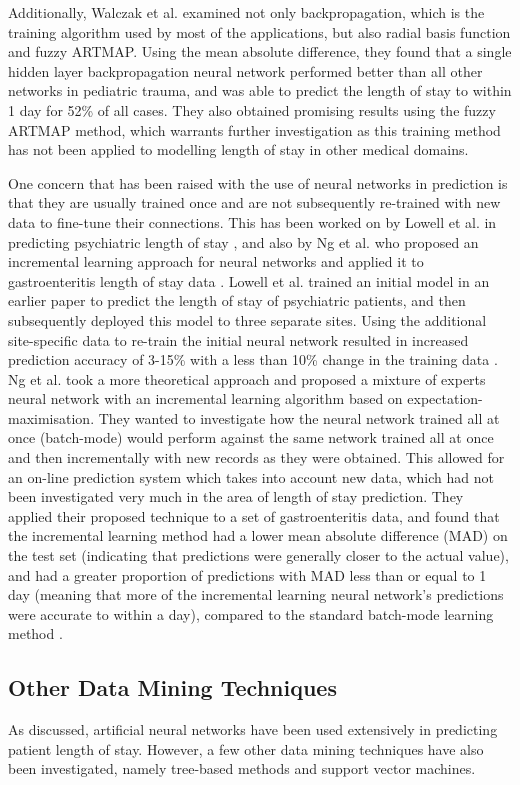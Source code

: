 Additionally, Walczak et al. examined not only backpropagation, which
is the training algorithm used by most of the applications, but also radial
basis function and fuzzy ARTMAP. Using the mean absolute difference, they
found that a single hidden layer backpropagation neural network performed
better than all other networks in pediatric trauma, and was able to predict
the length of stay to within 1 day for 52\% of all cases. They also obtained
promising results using the fuzzy ARTMAP method, which warrants further
investigation as this training method has not been applied to modelling
length of stay in other medical domains.

One concern that has been raised with the use of neural networks in prediction
is that they are usually trained once and are not subsequently re-trained with
new data to fine-tune their connections. This has been worked on by Lowell et
al. in predicting psychiatric length of stay \citep{Lowell1997}, and also by
Ng et al. who proposed an incremental learning approach for neural networks
and applied it to gastroenteritis length of stay data \citep{Ng2006}. Lowell et
al. trained an initial model in an earlier paper to predict the length of stay
of psychiatric patients, and then subsequently deployed this model to three
separate sites. Using the additional site-specific data to re-train the initial
neural network resulted in increased prediction accuracy of 3-15\% with a less
than 10\% change in the training data \citep{Lowell1997}. Ng et al. took a more
theoretical approach and proposed a mixture of experts neural network with an
incremental learning algorithm based on expectation-maximisation. They wanted
to investigate how the neural network trained all at once (batch-mode)
would perform against the same network trained all at once and then
incrementally with new records as they were obtained. This allowed for an
on-line prediction system which takes into account new data, which had not
been investigated very much in the area of length of stay prediction. They
applied their proposed technique to a set of gastroenteritis data, and found
that the incremental learning method had a lower mean absolute difference (MAD)
on the test set (indicating that predictions were generally closer to the
actual value), and had a greater proportion of predictions with MAD less than
or equal to 1 day (meaning that more of the incremental learning neural
network's predictions were accurate to within a day), compared to the standard
batch-mode learning method \citep{Ng2006}.

\subsection{Other Data Mining Techniques}
As discussed, artificial neural networks have been used extensively in
predicting patient length of stay. However, a few other data mining techniques
have also been investigated, namely tree-based methods and support vector
machines.

